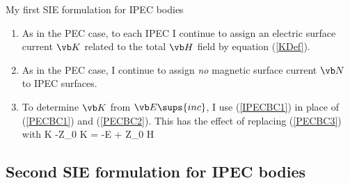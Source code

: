 \documentclass{article}
\begin{document}
My first SIE formulation for IPEC bodies 
%
\begin{enumerate}
 \item As in the PEC case, to each IPEC I continue to assign an electric
       surface current $\vb K$ related to the total $\vb H$ field
       by equation (\ref{KDef}).
 \item As in the PEC case, I continue to assign \textit{no} magnetic 
       surface current $\vb N$ to IPEC surfaces.
 \item To determine $\vb K$ from $\vb E\sups{inc}$, I use 
        (\ref{IPECBC1}) in place of (\ref{PECBC1}) and (\ref{PECBC2}).
        This has the effect of replacing (\ref{PECBC3}) with
        {
                 \vbGamma{} \star \vb K
      -\zeta Z_0\times \vbGamma{} \star \vb K
                 = -\vb E + \zeta Z_0 \times \vb H
        }
\end{enumerate}

\subsection{Second SIE formulation for IPEC bodies}
\end{document}
